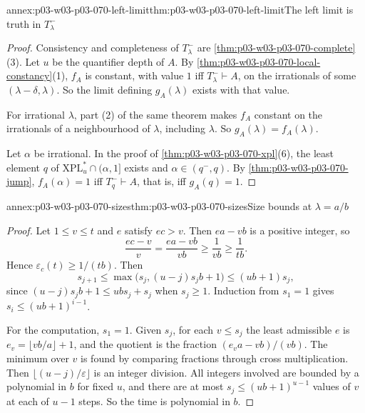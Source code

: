 \begin{annexitem}{annex:p03-w03-p03-070-left-limit}{thm:p03-w03-p03-070-left-limit}{The left limit is truth in \(T^-_\lambda\)}
\begin{proof}
Consistency and completeness of \(T^-_\lambda\) are
\cref{thm:p03-w03-p03-070-complete}(3).  Let \(u\) be the quantifier depth of
\(A\).  By \cref{thm:p03-w03-p03-070-local-constancy}(1), \(f_A\) is
constant, with value \(1\) iff \(T^-_\lambda\vdash A\), on the irrationals of
some \((\lambda-\delta,\lambda)\).  So the limit defining \(g_A(\lambda)\)
exists with that value.

For irrational \(\lambda\), part (2) of the same theorem makes \(f_A\)
constant on the irrationals of a neighbourhood of \(\lambda\), including
\(\lambda\).  So \(g_A(\lambda)=f_A(\lambda)\).

Let \(\alpha\) be irrational.  In the proof of
\cref{thm:p03-w03-p03-070-xpl}(6), the least element \(q\) of
\(\mathrm{XPL}^\ast_u\cap(\alpha,1]\) exists and \(\alpha\in(q^-,q)\).  By
\cref{thm:p03-w03-p03-070-jump}, \(f_A(\alpha)=1\) iff \(T^-_q\vdash A\), that
is, iff \(g_A(q)=1\).
\end{proof}
\end{annexitem}

\begin{annexitem}{annex:p03-w03-p03-070-sizes}{thm:p03-w03-p03-070-sizes}{Size bounds at \(\lambda=a/b\)}
\begin{proof}
Let \(1\leq v\leq t\) and \(e\) satisfy \(ec>v\).  Then \(ea-vb\) is a
positive integer, so
\[
 \frac{ec-v}{v}=\frac{ea-vb}{vb}\geq\frac1{vb}\geq\frac1{tb} .
\]
Hence \(\varepsilon_c(t)\geq1/(tb)\).  Then
\[
 s_{j+1}\leq\max\bigl(s_j,(u-j)s_jb+1\bigr)\leq(ub+1)s_j ,
\]
since \((u-j)s_jb+1\leq ubs_j+s_j\) when \(s_j\geq1\).  Induction from
\(s_1=1\) gives \(s_i\leq(ub+1)^{i-1}\).

For the computation, \(s_1=1\).  Given \(s_j\), for each \(v\leq s_j\) the
least admissible \(e\) is \(e_v=\lfloor vb/a\rfloor+1\), and the quotient is
the fraction \((e_va-vb)/(vb)\).  The minimum over \(v\) is found by comparing
fractions through cross multiplication.  Then
\(\lfloor(u-j)/\varepsilon\rfloor\) is an integer division.  All integers
involved are bounded by a polynomial in \(b\) for fixed \(u\), and there are
at most \(s_j\leq(ub+1)^{u-1}\) values of \(v\) at each of \(u-1\) steps.  So
the time is polynomial in \(b\).
\end{proof}
\end{annexitem}

